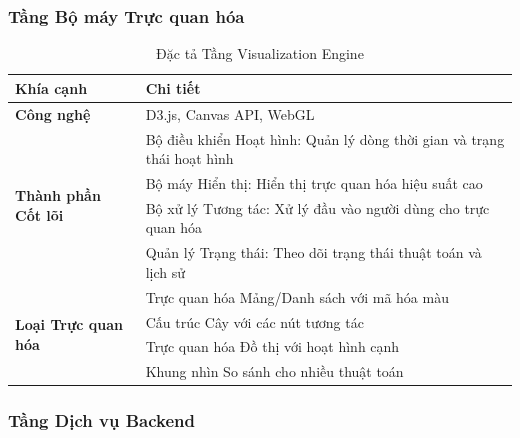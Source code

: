 \subsubsection{Tầng Bộ máy Trực quan hóa}

\begin{table}[H]
\centering
\caption{Đặc tả Tầng Visualization Engine}
\label{tab:visualization-engine-specs}
\begin{tabular}{|p{3.5cm}|p{9.5cm}|}
\hline
\textbf{Khía cạnh} & \textbf{Chi tiết} \\
\hline
\textbf{Công nghệ} & D3.js, Canvas API, WebGL \\
\hline
\multirow{4}{3.5cm}{\textbf{Thành phần Cốt lõi}} 
& Bộ điều khiển Hoạt hình: Quản lý dòng thời gian và trạng thái hoạt hình \\
\cline{2-2}
& Bộ máy Hiển thị: Hiển thị trực quan hóa hiệu suất cao \\
\cline{2-2}
& Bộ xử lý Tương tác: Xử lý đầu vào người dùng cho trực quan hóa \\
\cline{2-2}
& Quản lý Trạng thái: Theo dõi trạng thái thuật toán và lịch sử \\
\hline
\multirow{4}{3.5cm}{\textbf{Loại Trực quan hóa}} 
& Trực quan hóa Mảng/Danh sách với mã hóa màu \\
\cline{2-2}
& Cấu trúc Cây với các nút tương tác \\
\cline{2-2}
& Trực quan hóa Đồ thị với hoạt hình cạnh \\
\cline{2-2}
& Khung nhìn So sánh cho nhiều thuật toán \\
\hline
\end{tabular}
\end{table}

\subsubsection{Tầng Dịch vụ Backend}

